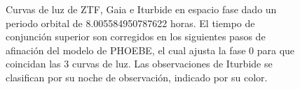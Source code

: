 \begin{figure}[!h]
	\caption{Curvas de luz de ZTF, Gaia e Iturbide en espacio fase dado un
		periodo orbital de 8.005584950787622 horas. El tiempo de conjunción
		superior son corregidos en los siguientes pasos de afinación del modelo
		de PHOEBE, el cual ajusta la fase 0 para que coincidan las 3 curvas de
		luz. Las observaciones de Iturbide se clasifican por su noche de
		observación, indicado por su color.}
	\label{gaiaIturbideZtfPhaseFold}
\end{figure}